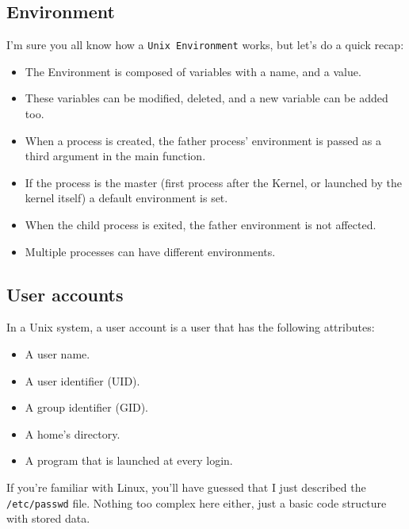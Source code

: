 \documentclass{42-en}
\begin{document}
    \subsection{Environment}
        I'm sure you all know how a \texttt{Unix Environment} works, but let's
        do a quick recap:
        \begin{itemize}\itemsep1pt
            \item The Environment is composed of variables with a name, and a
            value.
            \item These variables can be modified, deleted, and a new variable
            can be added too.
            \item When a process is created, the father process' environment
            is passed as a third argument in the main function.
            \item If the process is the master (first process after the Kernel,
            or launched by the kernel itself) a default environment is set.
            \item When the child process is exited, the father environment is
            not affected.
            \item Multiple processes can have different environments.
        \end{itemize}
    \subsection{User accounts}
        In a Unix system, a user account is a user that has the following
        attributes:
        \begin{itemize}\itemsep1pt
            \item A user name.
            \item A user identifier (UID).
            \item A group identifier (GID).
            \item A home's directory.
            \item A program that is launched at every login.
        \end{itemize}
        If you're familiar with Linux, you'll have guessed that I just described
        the \texttt{/etc/passwd} file. Nothing too complex here either, just a
        basic code structure with stored data.
\end{document}
